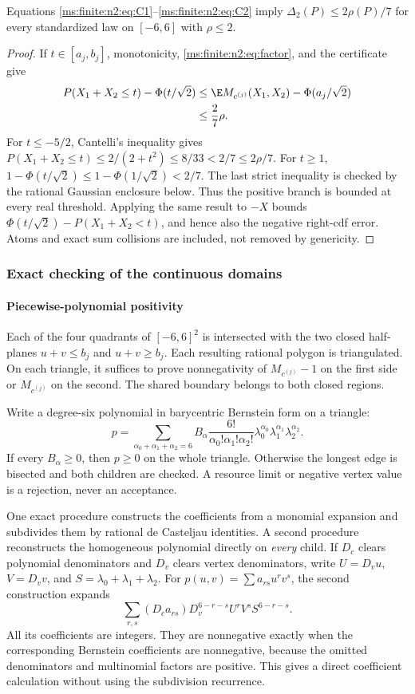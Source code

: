 \begin{lemma}\label{ms:finite:n2:lem:certimp}
Equations \eqref{ms:finite:n2:eq:C1}--\eqref{ms:finite:n2:eq:C2} imply
$\Delta_2(P)\le2\rho(P)/7$ for every standardized law on $[-6,6]$ with
$\rho\le2$.
\end{lemma}
\begin{proof}
If $t\in[a_j,b_j]$, monotonicity, \eqref{ms:finite:n2:eq:factor}, and the certificate give
\begin{align*}
 P(X_1+X_2\le t)-\Phi(t/\sqrt2)
 &\le\E M_{c^{(j)}}(X_1,X_2)-\Phi(a_j/\sqrt2)\\
 &\le\frac27\rho.
\end{align*}
For $t\le-5/2$, Cantelli's inequality gives
$P(X_1+X_2\le t)\le2/(2+t^2)\le8/33<2/7\le2\rho/7$.
For $t\ge1$, $1-\Phi(t/\sqrt2)\le1-\Phi(1/\sqrt2)<2/7$.
The last strict inequality is checked by the rational Gaussian enclosure below.
Thus the positive branch is bounded at every real threshold.
Applying the same result to $-X$ bounds
$\Phi(t/\sqrt2)-P(X_1+X_2<t)$, and hence also the negative right-cdf error.
Atoms and exact sum collisions are included, not removed by genericity.
\end{proof}

\subsubsection{Exact checking of the continuous domains}
\paragraph{Piecewise-polynomial positivity}
Each of the four quadrants of $[-6,6]^2$ is intersected with the two closed
half-planes $u+v\le b_j$ and $u+v\ge b_j$. Each resulting rational polygon is
triangulated. On each triangle, it suffices to prove nonnegativity of
$M_{c^{(j)}}-1$ on the first side or $M_{c^{(j)}}$ on the second.
The shared boundary belongs to both closed regions.

Write a degree-six polynomial in barycentric Bernstein form on a triangle:
\[
 p=\sum_{\alpha_0+\alpha_1+\alpha_2=6}
 B_\alpha\frac{6!}{\alpha_0!\alpha_1!\alpha_2!}
 \lambda_0^{\alpha_0}\lambda_1^{\alpha_1}\lambda_2^{\alpha_2}.
\]
If every $B_\alpha\ge0$, then $p\ge0$ on the whole triangle. Otherwise the
longest edge is bisected and both children are checked. A resource limit or
negative vertex value is a rejection, never an acceptance.

One exact procedure constructs the coefficients from a monomial expansion
and subdivides them by rational de Casteljau identities. A second procedure
reconstructs the homogeneous polynomial directly on \emph{every} child.
If $D_c$ clears polynomial denominators and $D_v$ clears vertex denominators,
write $U=D_vu$, $V=D_vv$, and $S=\lambda_0+\lambda_1+\lambda_2$.
For $p(u,v)=\sum a_{rs}u^rv^s$, the second construction expands
\[
 \sum_{r,s}(D_ca_{rs})D_v^{6-r-s}U^rV^sS^{6-r-s}.
\]
All its coefficients are integers. They are nonnegative exactly when the
corresponding Bernstein coefficients are nonnegative, because the omitted
denominators and multinomial factors are positive. This gives a direct
coefficient calculation without using the subdivision recurrence.

